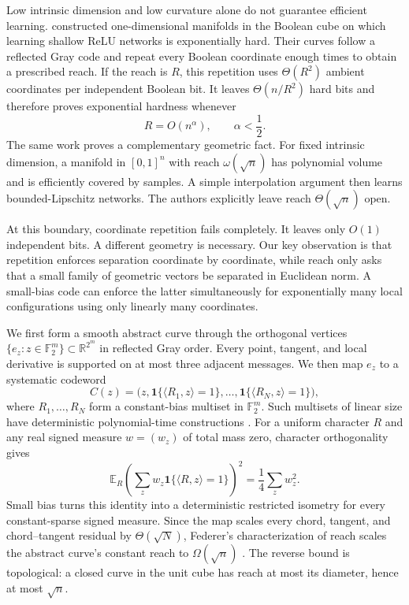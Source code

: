 \documentclass{article}
\theoremstyle{definition}
\theoremstyle{remark}
\newcommand{\Ftwo}{\mathbb F_2}
\newcommand{\R}{\mathbb R}
\newcommand{\1}{\mathbf 1}
\begin{document}
Low intrinsic dimension and low curvature alone do not guarantee efficient learning. \citet{kiani2024manifold} constructed one-dimensional manifolds in the Boolean cube on which learning shallow ReLU networks is exponentially hard. Their curves follow a reflected Gray code and repeat every Boolean coordinate enough times to obtain a prescribed reach. If the reach is $R$, this repetition uses $\Theta(R^2)$ ambient coordinates per independent Boolean bit. It leaves $\Theta(n/R^2)$ hard bits and therefore proves exponential hardness whenever \[ R=O(n^\alpha),\qquad \alpha<\frac12. \] The same work proves a complementary geometric fact. For fixed intrinsic dimension, a manifold in $[0,1]^n$ with reach $\omega(\sqrt n)$ has polynomial volume and is efficiently covered by samples. A simple interpolation argument then learns bounded-Lipschitz networks. The authors explicitly leave reach $\Theta(\sqrt n)$ open.

At this boundary, coordinate repetition fails completely. It leaves only $O(1)$ independent bits. A different geometry is necessary. Our key observation is that repetition enforces separation coordinate by coordinate, while reach only asks that a small family of geometric vectors be separated in Euclidean norm. A small-bias code can enforce the latter simultaneously for exponentially many local configurations using only linearly many coordinates.

We first form a smooth abstract curve through the orthogonal vertices $\{e_z:z\in\Ftwo^m\}\subset\R^{2^m}$ in reflected Gray order. Every point, tangent, and local derivative is supported on at most three adjacent messages. We then map $e_z$ to a systematic codeword \[ C(z)=\bigl(z,\mathbf1\{\langle R_1,z\rangle=1\},\ldots, \mathbf1\{\langle R_N,z\rangle=1\}\bigr), \] where $R_1,\ldots,R_N$ form a constant-bias multiset in $\Ftwo^m$. Such multisets of linear size have deterministic polynomial-time constructions \citep{naor1993smallbias,tashma2017balanced}. For a uniform character $R$ and any real signed measure $w=(w_z)$ of total mass zero, character orthogonality gives
\begin{equation}
\mathbb E_R\left(\sum_z w_z\mathbf1\{\langle R,z\rangle=1\}\right)^2
=\frac14\sum_z w_z^2.
\label{eq:character-isometry-intro}
\end{equation}
Small bias turns this identity into a deterministic restricted isometry for every constant-sparse signed measure. Since the map scales every chord, tangent, and chord--tangent residual by $\Theta(\sqrt N)$, Federer's characterization of reach scales the abstract curve's constant reach to $\Omega(\sqrt n)$ \citep{federer1959curvature,aamari2019reach}. The reverse bound is topological: a closed curve in the unit cube has reach at most its diameter, hence at most $\sqrt n$.
\end{document}
